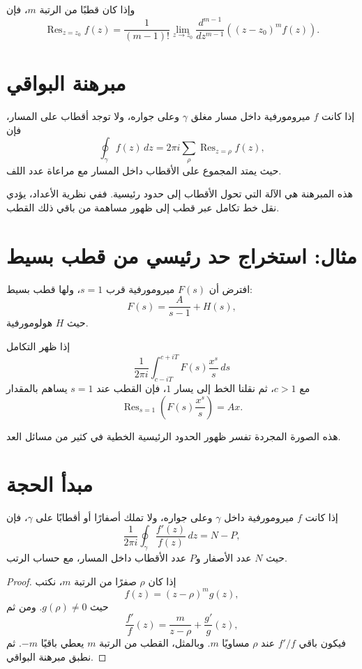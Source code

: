 وإذا كان قطبًا من الرتبة \(m\)، فإن
\[
\operatorname{Res}_{z=z_0}f(z)
=
\frac{1}{(m-1)!}
\lim_{z\to z_0}
\frac{d^{m-1}}{dz^{m-1}}
\left((z-z_0)^m f(z)\right).
\]

\section{مبرهنة البواقي}

\begin{theorem}
\label{thm:residue-theorem}
إذا كانت \(f\) ميرومورفية داخل مسار مغلق \(\gamma\) وعلى جواره، ولا توجد أقطاب على المسار، فإن
\[
\oint_\gamma f(z)\,dz
=
2\pi i
\sum_{\rho}
\operatorname{Res}_{z=\rho}f(z),
\]
حيث يمتد المجموع على الأقطاب داخل المسار مع مراعاة عدد اللف.
\end{theorem}

هذه المبرهنة هي الآلة التي تحول الأقطاب إلى حدود رئيسية. ففي نظرية الأعداد، يؤدي نقل خط تكامل عبر قطب إلى ظهور مساهمة من باقي ذلك القطب.

\section{مثال: استخراج حد رئيسي من قطب بسيط}

افترض أن \(F(s)\) ميرومورفية قرب \(s=1\)، ولها قطب بسيط:
\[
F(s)=\frac{A}{s-1}+H(s),
\]
حيث \(H\) هولومورفية.

إذا ظهر التكامل
\[
\frac{1}{2\pi i}\int_{c-iT}^{c+iT}F(s)\frac{x^s}{s}\,ds
\]
مع \(c>1\)، ثم نقلنا الخط إلى يسار \(1\)، فإن القطب عند \(s=1\) يساهم بالمقدار
\[
\operatorname{Res}_{s=1}
\left(F(s)\frac{x^s}{s}\right)
=
Ax.
\]

هذه الصورة المجردة تفسر ظهور الحدود الرئيسية الخطية في كثير من مسائل العد.

\section{مبدأ الحجة}

\begin{theorem}
\label{thm:argument-principle}
\provedhere
إذا كانت \(f\) ميرومورفية داخل \(\gamma\) وعلى جواره، ولا تملك أصفارًا أو أقطابًا على \(\gamma\)، فإن
\[
\frac{1}{2\pi i}
\oint_\gamma
\frac{f'(z)}{f(z)}\,dz
=
N-P,
\]
حيث \(N\) عدد الأصفار و\(P\) عدد الأقطاب داخل المسار، مع حساب الرتب.
\end{theorem}

\begin{proof}
إذا كان \(\rho\) صفرًا من الرتبة \(m\)، نكتب
\[
f(z)=(z-\rho)^m g(z),
\]
حيث \(g(\rho)\neq0\). ومن ثم
\[
\frac{f'}{f}(z)
=
\frac{m}{z-\rho}+\frac{g'}{g}(z),
\]
فيكون باقي \(f'/f\) عند \(\rho\) مساويًا \(m\). وبالمثل، القطب من الرتبة \(m\) يعطي باقيًا \(-m\). ثم نطبق مبرهنة البواقي.
\end{proof}

